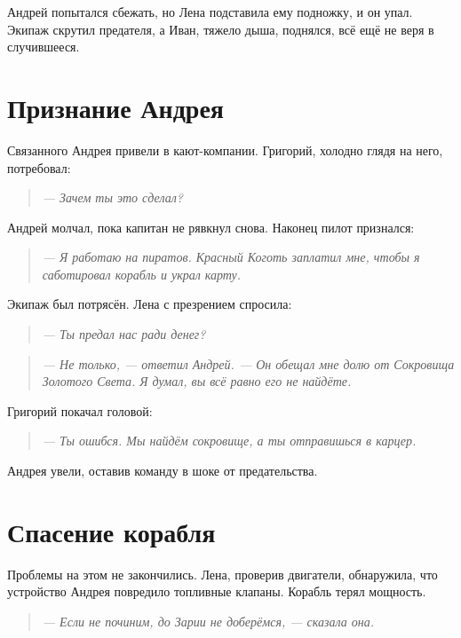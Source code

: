 \documentclass[12pt,a4paper]{book}
\newenvironment{dialogue}{\begin{quote}\itshape}{\end{quote}}
\begin{document}
Андрей попытался сбежать, но Лена подставила ему подножку, и он упал. Экипаж скрутил предателя, а Иван, тяжело дыша, поднялся, всё ещё не веря в случившееся.

\section*{Признание Андрея}

Связанного Андрея привели в кают-компании. Григорий, холодно глядя на него, потребовал:

\begin{dialogue}
--- Зачем ты это сделал?
\end{dialogue}

Андрей молчал, пока капитан не рявкнул снова. Наконец пилот признался:

\begin{dialogue}
--- Я работаю на пиратов. Красный Коготь заплатил мне, чтобы я саботировал корабль и украл карту.
\end{dialogue}

Экипаж был потрясён. Лена с презрением спросила:

\begin{dialogue}
--- Ты предал нас ради денег?
\end{dialogue}

\begin{dialogue}
--- Не только, --- ответил Андрей. --- Он обещал мне долю от Сокровища Золотого Света. Я думал, вы всё равно его не найдёте.
\end{dialogue}

Григорий покачал головой:

\begin{dialogue}
--- Ты ошибся. Мы найдём сокровище, а ты отправишься в карцер.
\end{dialogue}

Андрея увели, оставив команду в шоке от предательства.

\section*{Спасение корабля}

Проблемы на этом не закончились. Лена, проверив двигатели, обнаружила, что устройство Андрея повредило топливные клапаны. Корабль терял мощность.

\begin{dialogue}
--- Если не починим, до Зарии не доберёмся, --- сказала она.
\end{dialogue}
\end{document}
